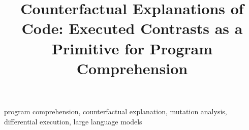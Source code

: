 \documentclass[10pt,conference]{IEEEtran}
\begin{document}
\title{Counterfactual Explanations of Code: Executed Contrasts as a Primitive for Program Comprehension}
\author{}
\maketitle

\begin{IEEEkeywords}
program comprehension, counterfactual explanation, mutation analysis, differential execution, large language models
\end{IEEEkeywords}








\end{document}
